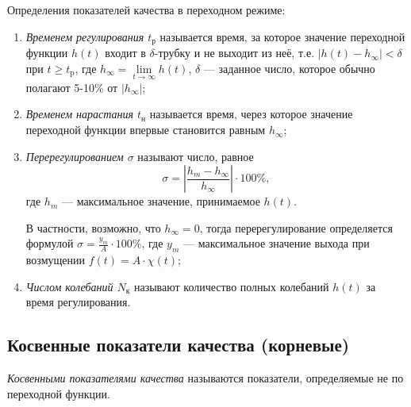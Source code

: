 \documentclass[../../TAU.tex]{subfiles}
\begin{document}
    Определения показателей качества в переходном режиме:
    \begin{enumerate}
        \item {\it Временем регулирования $t_\text{р}$}
            называется время, за которое значение переходной функции $h(t)$ входит в $\delta$-трубку и не выходит из неё, т.е. $|h(t)-h_{\infty}| <\delta $ при $t \ge t_\text{p}$, где $h_\infty = \lim\limits_{t\rightarrow\infty} h(t)$, $\delta$ --- заданное число, которое обычно полагают 5-10\% от $|h_{\infty}|$;
        \item {\it Временем нарастания $t_\text{н}$}
            называется время, через которое значение переходной функции впервые становится равным $h_\infty$;
        \item {\it Перерегулированием $\sigma$}
            называют число, равное
            $$
                \sigma = \left|\frac{h_m-h_\infty}{h_\infty}\right|\cdot100\%,
            $$
            где $h_m$ --- максимальное значение, принимаемое $h(t)$.

            В частности, возможно, что $h_\infty = 0$, тогда перерегулирование определяется формулой $ \sigma = \frac{y_m}{A}\cdot 100\%$, где $y_m$ --- максимальное значение выхода при возмущении $f(t) = A\cdot\chi(t)$;
        \item {\it Числом колебаний $N_\text{к}$} 
            называют количество полных колебаний $h(t)$ за время регулирования.
    \end{enumerate}

\subsection{Косвенные показатели качества (корневые)}

    {\it Косвенными показателями качества} называются показатели, определяемые не по переходной функции.
\end{document}

